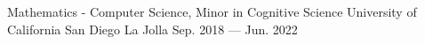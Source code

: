 

\begin{cventries}

  \cventry
    {Mathematics - Computer Science, Minor in Cognitive Science} %
    {University of California San Diego} %
    {La Jolla} %
    {Sep. 2018 — Jun. 2022} %
    {}

\end{cventries}